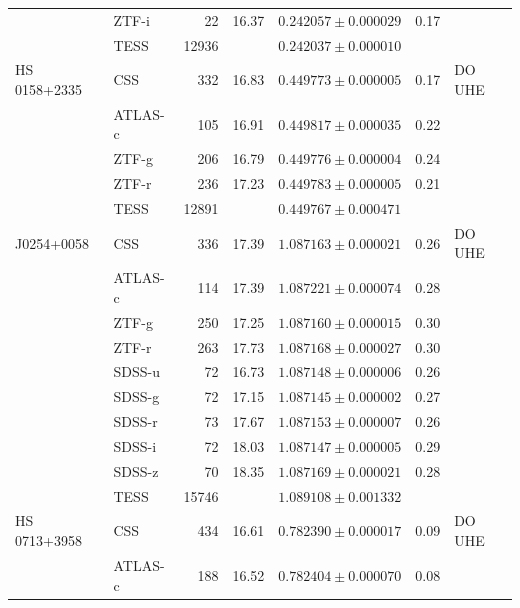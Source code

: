 \documentclass{aa}
\begin{document}
\begin{appendix}
\begin{table}
\begin{tabular}{l l r r c c l}
               & ZTF-i  &        22     & 16.37 & $0.242057\pm0.000029$ & 0.17 &  \\
        &   TESS      &    12936          &           & $0.242037\pm0.000010$ &        &              \\
\noalign{\smallskip}
HS\,0158+2335&            CSS        & 332    & 16.83 & $0.449773\pm0.000005$ & 0.17 & DO UHE \\
              &           ATLAS-c              & 105    & 16.91 & $0.449817\pm0.000035$ & 0.22 &  \\
              & ZTF-g   & 206   & 16.79 & $0.449776\pm0.000004$ & 0.24 &  \\
              & ZTF-r   & 236   & 17.23 & $0.449783\pm0.000005$ & 0.21 &  \\
        &   TESS      & 12891             &           & $0.449767\pm0.000471$ & & \\
\noalign{\smallskip}
J0254+0058&    CSS        &    336  & 17.39 & $1.087163\pm0.000021$ & 0.26 & DO UHE                            \\
              &           ATLAS-c              &    114  & 17.39 & $1.087221\pm0.000074$ & 0.28 &  \\
              & ZTF-g   &    250  & 17.25 & $1.087160\pm0.000015$ & 0.30 &  \\
              & ZTF-r   &    263  & 17.73 & $1.087168\pm0.000027$ & 0.30 &  \\
              &           SDSS-u &    72     & 16.73 & $1.087148\pm0.000006$ & 0.26 &  \\
              &           SDSS-g  &    72     & 17.15 & $1.087145\pm0.000002$ & 0.27 &              \\
              &           SDSS-r  &    73     & 17.67 & $1.087153\pm0.000007$ & 0.26 &              \\
              &           SDSS-i   &    72     & 18.03 & $1.087147\pm0.000005$ & 0.29 &              \\
              &           SDSS-z  &    70   & 18.35 & $1.087169\pm0.000021$ & 0.28 &              \\
        &   TESS      &    15746 &      & $1.089108\pm0.001332$ &      & \\
\noalign{\smallskip}
HS\,0713+3958 &CSS     &           434        & 16.61 & $0.782390\pm0.000017$ &              0.09 & DO UHE\\
              &           ATLAS-c              &           188        & 16.52 & $0.782404\pm0.000070$ & 0.08 &\\

\end{tabular}
\end{table}
\end{appendix}
\end{document}
